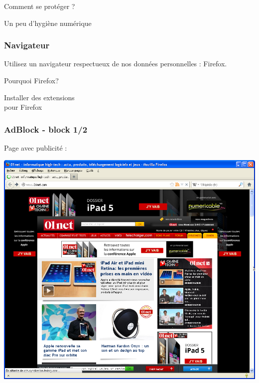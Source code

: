 \documentclass{beamer}
\begin{document}
\begin{frame}
\Huge{\centerline{Comment se protéger ?}}
\Huge{\centerline{Un peu d'hygiène numérique}}
\end{frame}

\begin{frame}
\frametitle{Navigateur}

Utilisez un navigateur respectueux de nos données personnelles : Firefox.

\begin{block}{Pourquoi Firefox?}
\end{block}
\justifying{}
\end{frame}

\begin{frame}
\begin{center}
\Huge{Installer des extensions \\ pour Firefox }
\end{center}
\end{frame}

\begin{frame}
\frametitle{AdBlock - block 1/2}
Page avec publicité :
\begin{center}
\includegraphics[scale=0.4] {./images/Adblock01.png}
\end{center}

\end{frame}
\end{document}
